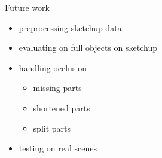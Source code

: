 \documentclass{beamer}
\begin{document}
\begin{frame}{Future work}
\begin{itemize}
\item preprocessing sketchup data
\item evaluating on full objects on sketchup
\item handling occlusion
\begin{itemize}
\item missing parts
\item shortened parts
\item split parts
\end{itemize}
\item testing on real scenes

\end{itemize}
\end{frame}
\end{document}
